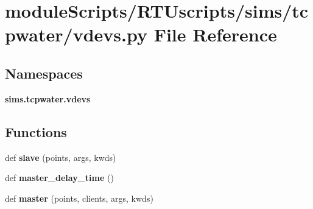 \section{module\+Scripts/\+R\+T\+Uscripts/sims/tcpwater/vdevs.py File Reference}
\label{tcpwater_2vdevs_8py}
\subsection*{Namespaces}
\begin{DoxyCompactItemize}
\item 
 {\bf sims.\+tcpwater.\+vdevs}
\end{DoxyCompactItemize}
\subsection*{Functions}
\begin{DoxyCompactItemize}
\item 
def {\bf slave} (points, args, kwds)
\item 
def {\bf master\+\_\+delay\+\_\+time} ()
\item 
def {\bf master} (points, clients, args, kwds)
\end{DoxyCompactItemize}
